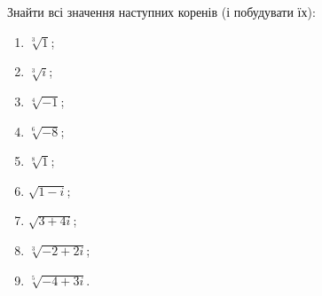 \setcounter{problem}{3}
\begin{problem}
	Знайти всі значення наступних коренів (і побудувати їх):
	\begin{multicols}{3}
		\begin{enumerate}
			\item $\sqrt[3]{1}$;
			\item $\sqrt[3]{i}$;
			\item $\sqrt[4]{-1}$;
			\item $\sqrt[6]{-8}$;
			\item $\sqrt[8]{1}$;
			\item $\sqrt{1-i}$;
			\item $\sqrt{3+4i}$;
			\item $\sqrt[3]{-2+2i}$;
			\item $\sqrt[5]{-4+3i}$.
		\end{enumerate}
	\end{multicols}
\end{problem}
